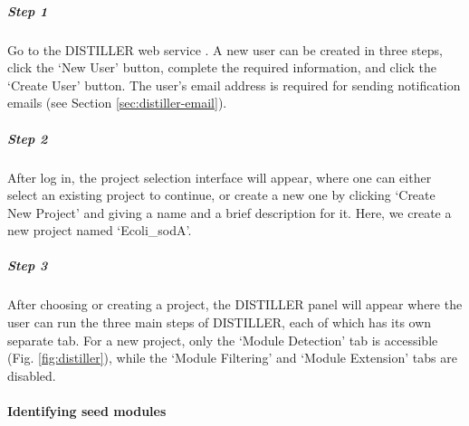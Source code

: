 \begin{small} %

\subparagraph{Step 1}	Go to the DISTILLER web service \cite{DISTILLER}. 
A new user can be created in three steps, click the `New User' button,
complete the required information, and click the `Create User' button.  The
user's email address is required for sending notification emails (see Section
\ref{sec:distiller-email}).

\subparagraph{Step 2}	After log in, the project selection interface will 
appear, where one can either select an existing project to continue, or create
a new one by clicking `Create New Project' and giving a name and a brief
description for it. Here, we create a new project named `Ecoli\_sodA'.

\subparagraph{Step 3}	After choosing or creating a project, the DISTILLER 
panel will appear where the user can run the three main steps of DISTILLER,
each of which has its own separate tab. For a new project, only the `Module
Detection' tab is accessible (Fig. \ref{fig:distiller}), while the `Module
Filtering' and `Module Extension' tabs are disabled.

\end{small} %



\paragraph{Identifying seed modules}

